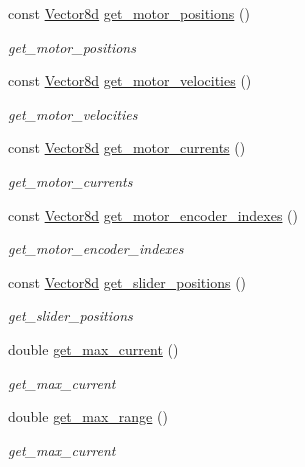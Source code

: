 \begin{DoxyCompactItemize}
const \hyperlink{common__header_8hpp_a98975ffbe0bca1296078e0350dfedd60}{Vector8d} \hyperlink{classblmc__robots_1_1TestBench8Motors_a9372bd2722944fa510aa56323f8955b8}{get\+\_\+motor\+\_\+positions} ()
\begin{DoxyCompactList}\small\item\em get\+\_\+motor\+\_\+positions \end{DoxyCompactList}\item 
const \hyperlink{common__header_8hpp_a98975ffbe0bca1296078e0350dfedd60}{Vector8d} \hyperlink{classblmc__robots_1_1TestBench8Motors_aaf4aa80251af98000ffad95eddf0b449}{get\+\_\+motor\+\_\+velocities} ()
\begin{DoxyCompactList}\small\item\em get\+\_\+motor\+\_\+velocities \end{DoxyCompactList}\item 
const \hyperlink{common__header_8hpp_a98975ffbe0bca1296078e0350dfedd60}{Vector8d} \hyperlink{classblmc__robots_1_1TestBench8Motors_a9bac22cb6522afd6412e8fbb56f11fbf}{get\+\_\+motor\+\_\+currents} ()
\begin{DoxyCompactList}\small\item\em get\+\_\+motor\+\_\+currents \end{DoxyCompactList}\item 
const \hyperlink{common__header_8hpp_a98975ffbe0bca1296078e0350dfedd60}{Vector8d} \hyperlink{classblmc__robots_1_1TestBench8Motors_ab1d81b573c721e5c8ad400ed4fb4d6ef}{get\+\_\+motor\+\_\+encoder\+\_\+indexes} ()
\begin{DoxyCompactList}\small\item\em get\+\_\+motor\+\_\+encoder\+\_\+indexes \end{DoxyCompactList}\item 
const \hyperlink{common__header_8hpp_a98975ffbe0bca1296078e0350dfedd60}{Vector8d} \hyperlink{classblmc__robots_1_1TestBench8Motors_a11bdbb6f0e4dd0824075ba309f69ad3a}{get\+\_\+slider\+\_\+positions} ()
\begin{DoxyCompactList}\small\item\em get\+\_\+slider\+\_\+positions \end{DoxyCompactList}\item 
double \hyperlink{classblmc__robots_1_1TestBench8Motors_abd3b8a40787ad9e6c019b849da9ca07c}{get\+\_\+max\+\_\+current} ()
\begin{DoxyCompactList}\small\item\em get\+\_\+max\+\_\+current \end{DoxyCompactList}\item 
double \hyperlink{classblmc__robots_1_1TestBench8Motors_a17ac05712b3cb4e63dfd8cdb80b16eea}{get\+\_\+max\+\_\+range} ()
\begin{DoxyCompactList}\small\item\em get\+\_\+max\+\_\+current \end{DoxyCompactList}\end{DoxyCompactItemize}
